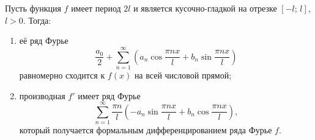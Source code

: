\begin{thm} \label{th22:6}
Пусть функция $f$ имеет период $2l$ и является кусочно-гладкой на отрезке $[-l;\, l]$, $l > 0$. Тогда:
\begin{enumerate}
    \item её ряд Фурье
    $$
    \frac{a_0}{2} + \sum_{n=1}^{\infty} \left(a_n \cos\frac{\pi n x}{l} + b_n \sin\frac{\pi n x}{l}\right)
    $$
    равномерно сходится к $f(x)$ на всей числовой прямой;
    \item производная $f'$ имеет ряд Фурье
    $$
    \sum_{n=1}^{\infty} \frac{\pi n}{l} \left(-a_n \sin\frac{\pi n x}{l} + b_n \cos\frac{\pi n x}{l}\right),
    $$
    который получается формальным дифференцированием ряда Фурье $f$.
\end{enumerate}
\end{thm}

